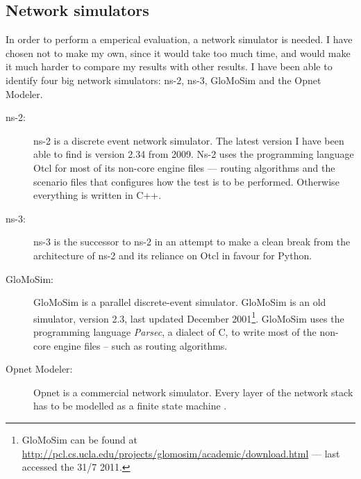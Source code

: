 \subsection{Network simulators}
\label{section:network_simulators}

In order to perform a emperical evaluation, a network simulator is needed. I have chosen not to make my own, since it would take too much time, and would make it much harder to compare my results with other results. I have been able to identify four big network simulators: ns-2, ns-3, GloMoSim and the Opnet Modeler.

\begin{description}
\item[ns-2:] ns-2 is a discrete event network simulator. The latest version I have been able to find is version 2.34 from 2009. Ns-2 uses the programming language Otcl for most of its non-core engine files --- routing algorithms and the scenario files that configures how the test is to be performed. Otherwise everything is written in C++.
\item[ns-3:] ns-3 is the successor to ns-2 in an attempt to make a clean break from the architecture of ns-2 and its reliance on Otcl in favour for Python.
\item[GloMoSim:] GloMoSim is a parallel discrete-event simulator. GloMoSim is an old simulator, version 2.3, last updated December 2001\footnote{GloMoSim can be found at \url{http://pcl.cs.ucla.edu/projects/glomosim/academic/download.html} --- last accessed the 31/7 2011.}. GloMoSim uses the programming language \emph{Parsec}, a dialect of C, to write most of the non-core engine files -- such as routing algorithms. 
\item[Opnet Modeler:] Opnet is a commercial network simulator. Every layer of the network stack has to be modelled as a finite state machine \cite{MANcom}. 
\end{description}


